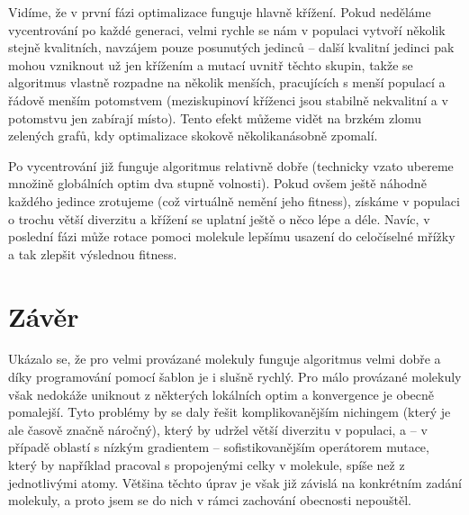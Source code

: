 \documentclass[journal]{IEEEtrancz}
\begin{document}
Vidíme, že v první fázi optimalizace funguje hlavně křížení. Pokud neděláme vycentrování po každé generaci, velmi rychle se nám v populaci vytvoří několik stejně kvalitních, navzájem pouze posunutých jedinců -- další kvalitní jedinci pak mohou vzniknout už jen křížením a mutací uvnitř těchto skupin, takže se algoritmus vlastně rozpadne na několik menších, pracujících s menší populací a řádově menším potomstvem (meziskupinoví kříženci jsou stabilně nekvalitní a v potomstvu jen zabírají místo). Tento efekt můžeme vidět na brzkém zlomu zelených grafů, kdy optimalizace skokově několikanásobně zpomalí.

Po vycentrování již funguje algoritmus relativně dobře (technicky vzato ubereme množině globálních optim dva stupně volnosti). Pokud ovšem ještě náhodně každého jedince zrotujeme (což virtuálně nemění jeho fitness), získáme v populaci o trochu větší diverzitu a křížení se uplatní ještě o něco lépe a déle. Navíc, v poslední fázi může rotace pomoci molekule lepšímu usazení do celočíselné mřížky a tak zlepšit výslednou fitness.


\section{Závěr}
Ukázalo se, že pro velmi provázané molekuly funguje algoritmus velmi dobře a díky programování pomocí šablon je i slušně rychlý. Pro málo provázané molekuly však nedokáže uniknout z některých lokálních optim a konvergence je obecně pomalejší. Tyto problémy by se daly řešit komplikovanějším nichingem (který je ale časově značně náročný), který by udržel větší diverzitu v populaci, a -- v případě oblastí s nízkým gradientem -- sofistikovanějším operátorem mutace, který by například pracoval s propojenými celky v molekule, spíše než z jednotlivými atomy. Většina těchto úprav je však již závislá na konkrétním zadání molekuly, a proto jsem se do nich v rámci zachování obecnosti nepouštěl.
\end{document}
